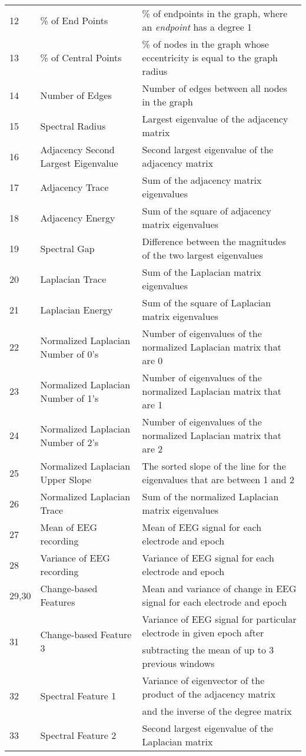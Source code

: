 \documentclass{article} %
\begin{document}
\begin{table}[htb]
\begin{tabular}{lll}
12&\% of End Points&\% of endpoints in the graph, where an {\em endpoint} has a degree 1\\
13&\% of Central Points&\% of nodes in the graph whose eccentricity is equal to the graph radius\\
14&Number of Edges&Number of edges between all nodes in the graph\\
15&Spectral Radius & Largest eigenvalue of the adjacency matrix\\
16&Adjacency Second Largest Eigenvalue&Second largest eigenvalue of the adjacency matrix\\
17&Adjacency Trace & Sum of the adjacency matrix eigenvalues\\
18&Adjacency Energy & Sum of the square of adjacency matrix eigenvalues\\
19&Spectral Gap &  Difference between the magnitudes of the two largest eigenvalues\\
20 &Laplacian Trace & Sum of the Laplacian matrix eigenvalues\\
21&Laplacian Energy &  Sum of the square of Laplacian matrix eigenvalues\\
22&Normalized Laplacian Number of 0's & Number of eigenvalues of the normalized Laplacian matrix that are 0\\
23&Normalized Laplacian Number of 1's&  Number of eigenvalues of the normalized Laplacian matrix that are 1\\
24&Normalized Laplacian Number of 2's& Number of eigenvalues of the normalized Laplacian matrix that are 2\\ 
25&Normalized Laplacian Upper Slope& The sorted slope of the line for the eigenvalues that are between 1 and 2\\
26&Normalized Laplacian Trace& Sum of the normalized Laplacian matrix eigenvalues\\
27&Mean of EEG recording&Mean of EEG signal for each electrode and epoch\\
28&Variance of EEG recording&Variance of EEG signal for each electrode and epoch\\
29,30&Change-based Features&Mean and variance of change in EEG signal for each electrode and epoch\\
\multirow{2}{*}{31}&\multirow{2}{*}{Change-based Feature 3}&Variance of EEG signal for particular electrode in given epoch after\\
&&subtracting the mean of up to 3 previous windows \\
\multirow{2}{*}{32}&\multirow{2}{*}{Spectral Feature 1}&Variance of eigenvector of the product of the adjacency matrix
\\&& and the inverse of the degree matrix\\
33&Spectral Feature 2&Second largest eigenvalue of the Laplacian matrix\\
\hline
\end{tabular}
\end{table}
\end{document}

